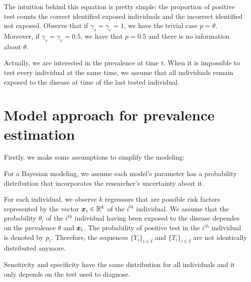 The intuition behind this equation is pretty simple: the proportion
of positive test counts the correct identified exposed individuals and the
incorrect identified not exposed. Observe that if $\gamma_s = \gamma_e = 1$, we have the trivial case $p =
\theta$. Moreover, if $\gamma_s = \gamma_e = 0.5$, we have that
$p = 0.5$ and there is no information about $\theta$. 

\begin{remark}
  Actually, we are interested in the prevalence at time $t$. When it is 
  impossible to test every individual at the same time, we assume that all
  individuals remain exposed to the disease at time of the last tested individual. 
\end{remark}


\section{Model approach for prevalence estimation}

Firstly, we make some assumptions to simplify the modeling:

\begin{assumption}  
  For a Bayesian modeling, we assume each model's parameter has a probability distribution that incorporates the researcher's uncertainty about it. 
\end{assumption}

\begin{assumption}
  For each individual, we observe $k$ regressors that are possible
  risk factors represented by the vector $\boldsymbol{x}_i \in \mathbb{R}^{k}$ of the $i^{th}$
  individual. We assume that the probability $\theta_i$ of the $i^{th}$ individual having been exposed
  to the disease dependes on the prevalence $\theta$ and $\boldsymbol{x}_i$. The
  probability of positive test in the $i^{th}$ individual is denoted by $p_i$. Therefore, the sequences $\{Y_i\}_{i \in I}$ and $\{T_i\}_{i \in I}$ are not
  identically distributed anymore.
\end{assumption}

\begin{assumption}
  Sensitivity and specificity have the same distribution for all
  individuals and it only depends on the test used to diagnose. 
\end{assumption}

